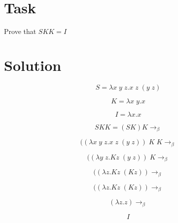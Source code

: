 \documentclass[12pt]{report}
\begin{document}
\section*{Task}

Prove that $S K K = I$ \newline

\section*{Solution}

$$S = \lambda x\; y\; z.x\; z\; (y\; z)$$

$$K = \lambda x\; y.x$$

$$I = \lambda x.x$$

$$S K K = (S K) K \rightarrow_\beta$$

$$((\lambda x\; y\; z.x\; z\; (y\; z))\; K\; K\rightarrow_\beta$$

$$((\lambda y\; z.K z\; (y\; z))\; K\rightarrow_\beta$$

$$((\lambda z.K z\; (K z))\rightarrow_\beta$$

$$((\lambda z.K z\; (K z))\rightarrow_\beta$$

$$(\lambda z.z)\rightarrow_\beta$$

$$I$$
\end{document}
